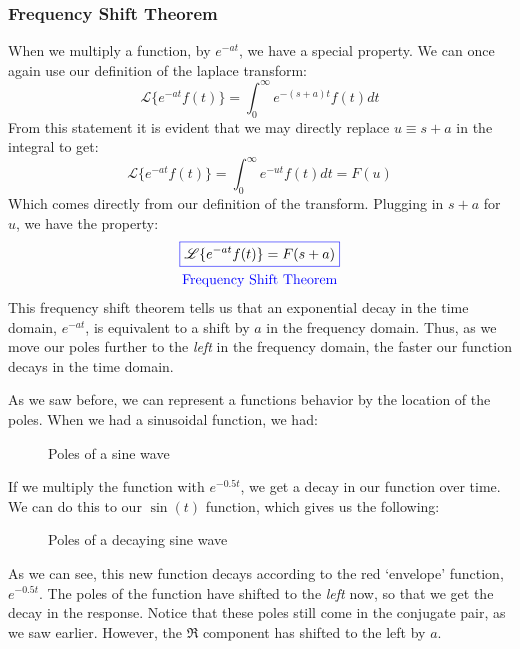 \subsubsection{Frequency Shift Theorem}
When we multiply a function, by $e^{-at}$, we have a special property. We can once again use our definition of the \gls{laplace transform}:
$$\mathscr{L}\{e^{-at}f(t)\}=\int_0^\infty{e^{-(s+a)t}f(t)dt}$$
From this statement it is evident that we may directly replace $u\equiv s+a$ in the integral to get:
$$\mathscr{L}\{e^{-at}f(t)\}=\int_0^\infty{e^{-ut}f(t)dt}=F(u)$$
Which comes directly from our definition of the transform. Plugging in $s+a$ for $u$, we have the property:
\begin{gather}
    \color{blue}\boxed{\color{black}\mathscr{L}\{e^{-at}f(t)\}=F(s+a)}\\
    \color{blue}\text{Frequency Shift Theorem}
    \end{gather}
This frequency shift theorem tells us that an exponential decay in the time domain, $e^{-at}$, is equivalent to a shift by $a$ in the frequency domain. Thus, as we move our poles further to the \textit{left} in the frequency domain, the faster our function decays in the time domain.

As we saw before, we can represent a functions behavior by the location of the poles. When we had a sinusoidal function, we had:
\begin{figure}[ht]
    \centering
    
    \caption{Poles of a sine wave}
    \label{fig:sin wave poles}
\end{figure}
If we multiply the function with $e^{-0.5t}$, we get a decay in our function over time. We can do this to our $\sin(t)$ function, which gives us the following:
\begin{figure}[ht]
    \centering
     
    \caption{Poles of a decaying sine wave}
    \label{fig:decaying sine wave poles}
\end{figure}
As we can see, this new function decays according to the red `envelope' function, $e^{-0.5t}$. The poles of the function have shifted to the \textit{left} now, so that we get the decay in the response. Notice that these poles still come in the conjugate pair, as we saw earlier. However, the $\Re$ component has shifted to the left by $a$.

